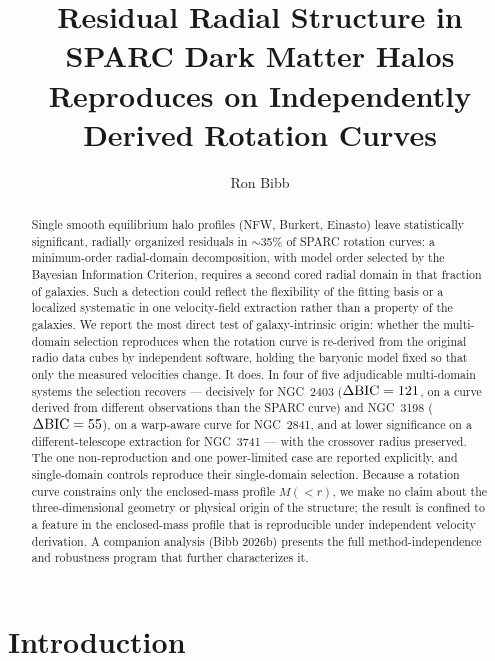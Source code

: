 \documentclass[twocolumn]{aastex701}
\newcommand{\dbic}{\Delta{\rm BIC}}
\begin{document}
\title{Residual Radial Structure in SPARC Dark Matter Halos Reproduces on
Independently Derived Rotation Curves}

\author[0009-0004-1153-2464]{Ron Bibb}

\begin{abstract}
Single smooth equilibrium halo profiles (NFW, Burkert, Einasto) leave
statistically significant, radially organized residuals in $\sim$35\% of SPARC
rotation curves: a minimum-order radial-domain decomposition, with model
order selected by the Bayesian Information Criterion, requires a second cored
radial domain in that fraction of galaxies. Such a detection could reflect the
flexibility of the fitting basis or a localized systematic in one velocity-field
extraction rather than a property of the galaxies. We report the most direct test of
galaxy-intrinsic origin: whether the multi-domain selection reproduces when the
rotation curve is re-derived from the original radio data cubes by independent
software, holding the baryonic model fixed so that only the measured velocities
change. It does. In four of five adjudicable multi-domain systems the selection
recovers --- decisively for NGC~2403 ($\dbic = 121$, on a curve derived from
different observations than the SPARC curve) and NGC~3198 ($\dbic = 55$), on a
warp-aware curve for NGC~2841, and at lower significance on a
different-telescope extraction for NGC~3741 --- with the crossover radius
preserved. The one non-reproduction and one power-limited case are reported
explicitly, and single-domain controls reproduce their single-domain selection.
Because a rotation curve constrains only the enclosed-mass profile $M({<}r)$, we make
no claim about the three-dimensional geometry or physical origin of the structure; the
result is confined to a feature in the enclosed-mass profile that is reproducible under
independent velocity derivation. A companion analysis (Bibb 2026b) presents the full method-independence and
robustness program that further characterizes it.
\end{abstract}


\section{Introduction} \label{sec:intro}
\end{document}
